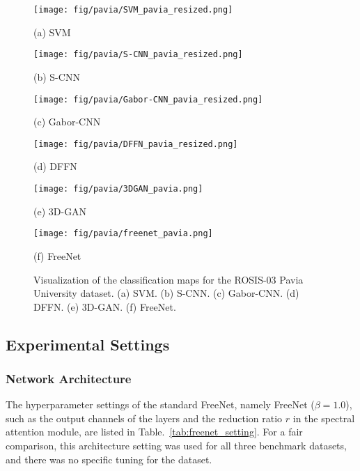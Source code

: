 \documentclass[journal]{IEEEtran}
\begin{document}
\begin{figure*}[htb]
  \begin{minipage}[b]{0.15\linewidth}
    \centering
    \texttt{[image: fig/pavia/SVM\_pavia\_resized.png]}
    \centerline{(a) SVM}
  \end{minipage}
  \hfill
  \hspace{4pt}
  \begin{minipage}[b]{0.15\linewidth}
    \centering
    \texttt{[image: fig/pavia/S-CNN\_pavia\_resized.png]}
    \centerline{(b) S-CNN}
  \end{minipage}
  \hfill
  \hspace{4pt}
  \begin{minipage}[b]{0.15\linewidth}
    \centering
    \texttt{[image: fig/pavia/Gabor-CNN\_pavia\_resized.png]}
    \centerline{(c) Gabor-CNN}
  \end{minipage}
  \hfill
  \hspace{4pt}
  \begin{minipage}[b]{0.15\linewidth}
    \centering
    \texttt{[image: fig/pavia/DFFN\_pavia\_resized.png]}
    \centerline{(d) DFFN}
  \end{minipage}
  \hfill
  \hspace{4pt}
  \begin{minipage}[b]{0.15\linewidth}
    \centering
    \texttt{[image: fig/pavia/3DGAN\_pavia.png]}
    \centerline{(e) 3D-GAN}
  \end{minipage}
  \hfill
  \hspace{4pt}
  \begin{minipage}[b]{0.15\linewidth}
    \centering
    \texttt{[image: fig/pavia/freenet\_pavia.png]}
    \centerline{(f) FreeNet}
  \end{minipage}
  \caption{Visualization of the classification maps for the ROSIS-03 Pavia University dataset.
    (a) SVM. (b) S-CNN. (c) Gabor-CNN. (d) DFFN. (e) 3D-GAN. (f) FreeNet.}
  \label{fig:vis_pavia}
\end{figure*}

\subsection{Experimental Settings}
\subsubsection{\textbf{Network Architecture}}
The hyperparameter settings of the standard FreeNet, namely FreeNet ($\beta=1.0$), such as the output channels of the layers and the reduction ratio $r$ in the spectral attention module, are listed in Table.~\ref{tab:freenet_setting}.
For a fair comparison, this architecture setting was used for all three benchmark datasets, and there was no specific tuning for the dataset.
\end{document}
